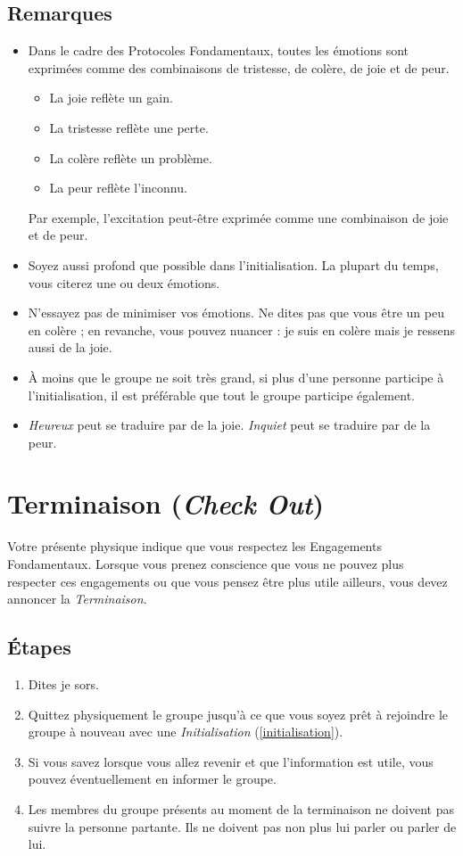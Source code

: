 \documentclass[paper=6in:9in,pagesize=pdftex,headinclude=on,footinclude=on,11pt]{scrbook}
\newcommand*{\numref}[1]{{\hyperref[{#1}]{\autoref*{#1}}}}
\let\oldsection\section
\renewcommand\section{\clearpage\oldsection}
\begin{document}
\subsection{Remarques}
\begin{itemize}
	\item Dans le cadre des Protocoles Fondamentaux, toutes les émotions sont exprimées comme des combinaisons de tristesse, de colère,
	      de joie et de peur.
	      \begin{itemize}
	      	\item La joie reflète un gain.
	      	\item La tristesse reflète une perte.
	      	\item La colère reflète un problème.
	      	\item La peur reflète l'inconnu.
	      \end{itemize}
	      Par exemple, l'excitation peut-être exprimée comme une combinaison de joie et de peur.
	\item Soyez aussi profond que possible dans l'initialisation. La plupart du temps, vous citerez une ou deux émotions.
	\item N'essayez pas de minimiser vos émotions. Ne dites pas que vous être \og{}un peu\fg{} en colère ; en revanche, vous pouvez nuancer :
	      \og{}je suis en colère mais je ressens aussi de la joie\fg{}.
	\item À moins que le groupe ne soit très grand, si plus d'une personne participe à l'initialisation, il est préférable que tout le groupe
	      participe également.
	\item \emph{Heureux} peut se traduire par de la joie. \emph{Inquiet} peut se traduire par de la peur.
\end{itemize}

\section{Terminaison (\emph{Check Out})} \label{terminaison}

Votre présente physique indique que vous respectez les Engagements Fondamentaux. Lorsque vous prenez conscience que vous ne pouvez plus
respecter ces engagements ou que vous pensez être plus utile ailleurs, vous devez annoncer la \emph{Terminaison}.

\subsection{Étapes}
\begin{enumerate}
	\item Dites \og{}je sors\fg{}.
	\item Quittez physiquement le groupe jusqu'à ce que vous soyez prêt à rejoindre le groupe à nouveau avec une \emph{Initialisation} (\numref{initialisation}).
	\item Si vous savez lorsque vous allez revenir et que l'information est utile, vous pouvez éventuellement en informer le groupe.
	\item Les membres du groupe présents au moment de la terminaison ne doivent pas suivre la personne partante. Ils ne doivent pas non plus lui parler ou
	      parler de lui.
\end{enumerate}
\end{document}
